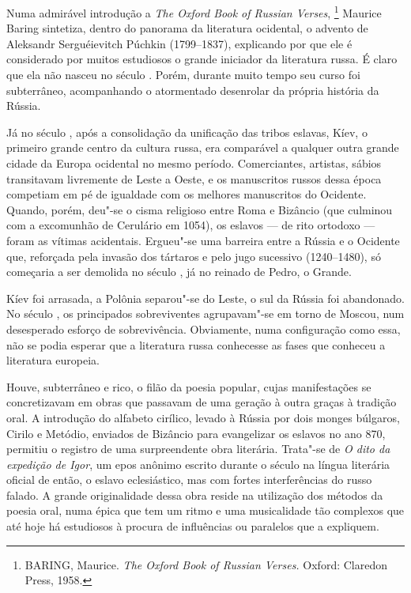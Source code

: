 Numa admirável introdução a \emph{The Oxford Book of Russian Verses}, \footnote{BARING, Maurice. \emph{The Oxford Book of Russian Verses.} Oxford: Claredon Press, 1958.}
Maurice Baring sintetiza, dentro do panorama da literatura ocidental, o
advento de Aleksandr Serguéievitch Púchkin (1799--1837), explicando por
que ele é considerado por muitos estudiosos o grande iniciador da
literatura russa. É claro que ela não nasceu no século . Porém, durante muito tempo seu curso foi subterrâneo, acompanhando o atormentado
desenrolar da própria história da Rússia.

Já no século , após a consolidação da unificação das tribos eslavas,
Kíev, o primeiro grande centro da cultura russa, era comparável a
qualquer outra grande cidade da Europa ocidental no mesmo período.
Comerciantes, artistas, sábios transitavam livremente de Leste a Oeste,
e os manuscritos russos dessa época competiam em pé de igualdade com os
melhores manuscritos do Ocidente. Quando, porém, deu"-se o cisma
religioso entre Roma e Bizâncio (que culmi­nou com a excomunhão de
Cerulário em 1054), os eslavos --- de rito ortodoxo --- foram as vítimas
acidentais. Ergueu"-se uma barreira entre a Rússia e o Ociden­te que,
reforçada pela invasão dos tártaros e pelo jugo sucessivo (1240--1480),
só começaria a ser demolida no século , já no reinado de
Pedro, o Grande.

Kíev foi arrasada, a Polônia separou"-se do Leste, o sul da Rússia foi
abando­nado. No século , os principados sobreviventes agrupavam"-se em
torno de Moscou, num desesperado esforço de sobrevivência. Obviamente,
numa con­figuração como essa, não se podia esperar que a literatura
russa conhecesse as fases que conheceu a literatura europeia.

Houve, subterrâneo e rico, o filão da poesia popular, cujas
manifestações se concretizavam em obras que passavam de uma geração à
outra graças à tradi­ção oral. A introdução do alfabeto cirílico,
levado à Rússia por dois monges búlgaros, Cirilo e Metódio, enviados de
Bizâncio para evangelizar os eslavos no ano 870, permitiu o registro de
uma surpreendente obra literária. Trata"-se de \emph{O dito da expedição de
Igor}, um epos anônimo escrito durante o século  na língua literária
oficial de então, o eslavo eclesiástico, mas com fortes interfe­rências
do russo falado. A grande originalidade dessa obra reside na utilização dos
métodos da poesia oral, numa épica que tem um ritmo e uma musicalidade
tão complexos que até hoje há estudiosos à procura de influências ou
paralelos que a expliquem.

